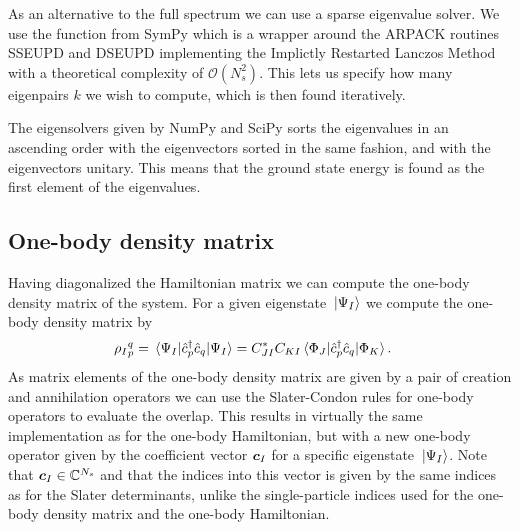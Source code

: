             As an alternative to the full spectrum we can use a sparse
            eigenvalue solver.
            We use the function  from SymPy
            \cite{sympy} which is a wrapper around the ARPACK routines SSEUPD
            and DSEUPD \cite{arpack} implementing the Implictly Restarted
            Lanczos Method with a theoretical complexity of $\mathcal{O}(N_s^2)$.
            This lets us specify how many eigenpairs $k$ we wish to compute,
            which is then found iteratively.

            The eigensolvers given by NumPy \cite{numpy} and SciPy \cite{sympy}
            sorts the eigenvalues in an ascending order with the eigenvectors
            sorted in the same fashion, and with the eigenvectors unitary.
            This means that the ground state energy is found as the first
            element of the eigenvalues.

        \subsection{One-body density matrix}
            Having diagonalized the Hamiltonian matrix we can compute the one-body
            density matrix of the system.
            For a given eigenstate $\ket*{\Psi_I}$ we compute the one-body
            density matrix by
            \begin{align}
                {\rho_I}^{q}_{p}
                &= \mel*{\Psi_I}{\hat{c}_{p}^{\dagger}\hat{c}_{q}}{\Psi_I}
                = C_{JI}^{*}C_{KI}
                \mel*{\Phi_J}{\hat{c}_{p}^{\dagger}\hat{c}_{q}}{\Phi_K}.
                \label{eq:ci-one-body-density}
            \end{align}
            As matrix elements of the one-body density matrix are given by a pair
            of creation and annihilation operators we can use the Slater-Condon
            rules for one-body operators to evaluate the overlap.
            This results in virtually the same implementation as for the
            one-body Hamiltonian, but with a new one-body operator given by the
            coefficient vector $\boldsymbol{c}_I$ for a specific eigenstate
            $\ket*{\Psi_I}$.
            Note that $\boldsymbol{c}_I \in \mathbb{C}^{N_s}$ and that the indices
            into this vector is given by the same indices as for the Slater
            determinants, unlike the single-particle indices used for the
            one-body density matrix and the one-body Hamiltonian.

